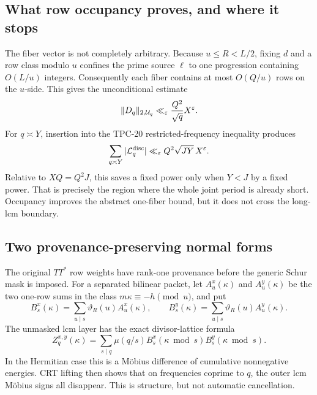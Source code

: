 \subsection{What row occupancy proves, and where it stops}

The fiber vector is not completely arbitrary.  Because \(u\le R<L/2\),
fixing \(d\) and a row class modulo \(u\) confines the prime source
\(\ell\) to one progression containing \(O(L/u)\) integers.  Consequently
each fiber contains at most \(O(Q/u)\) rows on the \(u\)-side.  This gives
the unconditional estimate
\begin{equation}
 \lVert D_q\rVert_{2,\mathcal U_q}
 \ll_\varepsilon \frac{Q^2}{\sqrt q}X^\varepsilon.
 \label{eq:tpc21-intro-occupancy}
\end{equation}
For \(q\asymp Y\), insertion into the TPC-20 restricted-frequency
inequality produces
\begin{equation}
 \sum_{q\asymp Y}|\mathcal L_q^{\rm disc}|
 \ll_\varepsilon Q^2\sqrt{JY}\,X^\varepsilon.
 \label{eq:tpc21-intro-occupancy-scalar}
\end{equation}
Relative to \(XQ=Q^2J\), this saves a fixed power only when \(Y<J\)
by a fixed power.  That is precisely the region where the whole joint
period is already short.  Occupancy improves the abstract one-fiber
bound, but it does not cross the long-lcm boundary.

\subsection{Two provenance-preserving normal forms}

The original \(TT^*\) row weights have rank-one provenance before the
generic Schur mask is imposed.  For a separated bilinear packet, let
\(A_u^x(\kappa)\) and \(A_u^y(\kappa)\) be the two one-row sums in the
class \(m\kappa\equiv-h\pmod u\), and put
\begin{equation}
 B_s^x(\kappa)=\sum_{u\mid s}\vartheta_R(u)A_u^x(\kappa),
 \qquad
 B_s^y(\kappa)=\sum_{u\mid s}\vartheta_R(u)A_u^y(\kappa).
 \label{eq:tpc21-intro-prefixes}
\end{equation}
The unmasked lcm layer has the exact divisor-lattice formula
\begin{equation}
 Z_q^{x,y}(\kappa)
 =\sum_{s\mid q}\mu(q/s)
 B_s^x(\kappa\bmod s)B_s^y(\kappa\bmod s).
 \label{eq:tpc21-intro-divisor-reassembly}
\end{equation}
In the Hermitian case this is a M\"obius difference of cumulative
nonnegative energies.  CRT lifting then shows that on frequencies
coprime to \(q\), the outer lcm M\"obius signs all disappear.  This is
structure, but not automatic cancellation.

